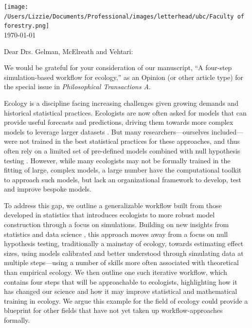 \documentclass[11pt]{article}
\begin{document}

\renewcommand{\refname}{\CHead{}}

\hspace{-5ex} \texttt{[image: /Users/Lizzie/Documents/Professional/images/letterhead/ubc/Faculty of forestry.png]}
\vspace{1.5ex}\\

\setlength{\parindent}{0pt}
\setlength{\parskip}{7pt}
\today

Dear Drs. Gelman, McElreath and Vehtari:

We would be grateful for your consideration of our manuscript, ``A four-step simulation-based workflow for ecology,'' as an Opinion (or other article type) for the special issue in \emph{Philosophical Transactions A}.

Ecology is a discipline facing increasing challenges given growing demands and historical statistical practices. Ecologists are now often asked for models that can provide useful forecasts and predictions, driving them towards more complex models to leverage larger datasets \citep{anderson2021trends,muff2022rewriting}. But many researchers---ourselves included---were not trained in the best statistical practices for these approaches, and thus often rely on a limited set of pre-defined models combined with null hypothesis testing \citep{quinn1983hypothesis,hobbs2006alternatives}. However, while many ecologists may not be formally trained in the fitting of large, complex models, a large number have the computational toolkit to approach such models, but lack an organizational framework to develop, test and improve bespoke models. 

To address this gap, we outline a generalizable workflow built from those developed in statistics  \citep{gelman2020bayesian,grinsztajn2021,vandeschoot2021} that introduces ecologists to more robust model construction through a focus on simulations. Building on new insights from statistics and data science \citep{gelman2020bayesian}, this approach moves away from a focus on null hypothesis testing, traditionally a mainstay of ecology, towards estimating effect sizes, using models calibrated and better understood through simulating data at multiple steps---using a number of skills more often associated with theoretical than empirical ecology. We then outline one such iterative workflow, which contains four steps that will be approachable to ecologists,  highlighting how it has changed our science and how it may improve statistical and mathematical training in ecology. We argue this example for the field of ecology could provide a blueprint for other fields that have not yet taken up workflow-approaches formally. 
\end{document}
